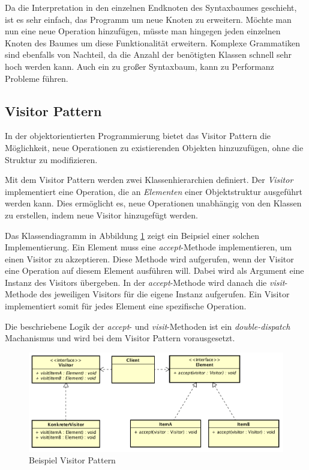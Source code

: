 \documentclass{llncs}
\begin{document}
Da die Interpretation in den einzelnen Endknoten des Syntaxbaumes geschieht, ist es sehr einfach, das Programm um neue Knoten zu erweitern. Möchte man nun eine neue Operation hinzufügen, müsste man hingegen jeden einzelnen Knoten des Baumes um diese Funktionalität erweitern. Komplexe Grammatiken sind ebenfalls von Nachteil, da die Anzahl der benötigten Klassen schnell sehr hoch werden kann. Auch ein zu großer Syntaxbaum, kann zu Performanz Probleme führen. 

\subsection{Visitor Pattern} \label{sec:visitor}
In der objektorientierten Programmierung bietet das Visitor Pattern die Möglichkeit, neue Operationen zu existierenden Objekten hinzuzufügen, ohne die Struktur zu modifizieren.

Mit dem Visitor Pattern werden zwei Klassenhierarchien definiert. Der \textit{Visitor} implementiert eine Operation, die an \textit{Elementen} einer Objektstruktur ausgeführt werden kann. 
Dies ermöglicht es, neue Operationen unabhängig von den Klassen zu erstellen, indem neue Visitor hinzugefügt werden.

Das Klassendiagramm in Abbildung \ref{fig:visitor-pattern} zeigt ein Beipsiel einer solchen Implementierung. Ein Element muss eine \textit{accept}-Methode implementieren, um einen Visitor zu akzeptieren. Diese Methode wird aufgerufen, wenn der Visitor eine Operation auf diesem Element ausführen will. Dabei wird als Argument eine Instanz des Visitors übergeben. In der \textit{accept}-Methode wird danach die \textit{visit}-Methode des jeweiligen Visitors für die eigene Instanz aufgerufen. Ein Visitor implementiert somit für jedes Element eine spezifische Operation.

Die beschriebene Logik der \textit{accept}- und \textit{visit}-Methoden ist ein \textit{double-dispatch} Machanismus und wird bei dem Visitor Pattern vorausgesetzt.

\begin{figure}[h]
	\centering
	\includegraphics[width=\textwidth]{images/VisitorPattern.png}
	\caption{Beispiel Visitor Pattern}
	\label{fig:visitor-pattern}
\end{figure}
\end{document}
